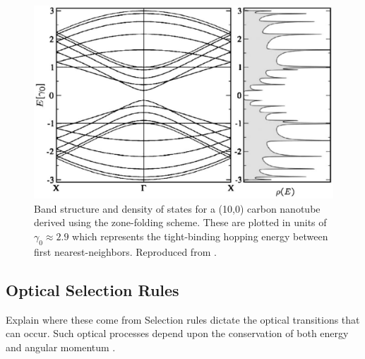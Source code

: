 

\begin{figure}[ht]
	\centering
	\includegraphics[scale=0.38]{images/chapter_optical_props/ten_zero_band_charlier}
	\caption{Band structure and density of states for a (10,0) carbon nanotube derived using the zone-folding scheme. These are plotted in units of $\gamma_0 \approx 2.9$ which represents the tight-binding hopping energy between first nearest-neighbors. Reproduced from \cite{charlier2007electronic}.}
	\label{fig:ten_zero_cnt}
\end{figure}


\subsection{Optical Selection Rules}
\label{section:selection_rules}
{\color{red} Explain where these come from}
Selection rules dictate the optical transitions that can occur. Such optical processes depend upon the conservation of both energy and angular momentum \cite{weismanKonoBook}.

